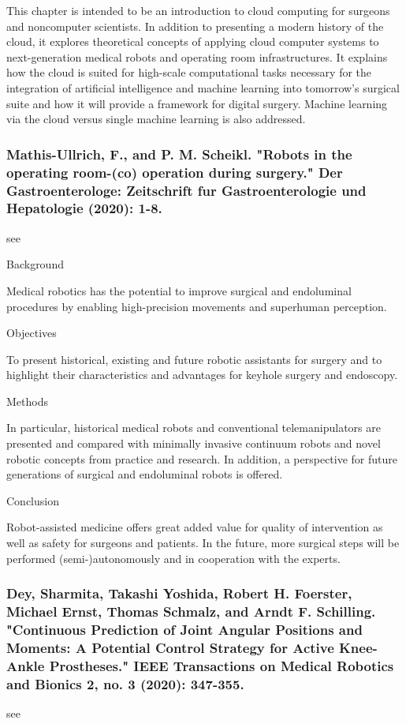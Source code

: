 \documentclass[conference]{IEEEtran}
\begin{document}
This chapter is intended to be an introduction to cloud computing for surgeons and noncomputer scientists. In addition to presenting a modern history of the cloud, it explores theoretical concepts of applying cloud computer systems to next-generation medical robots and operating room infrastructures. It explains how the cloud is suited for high-scale computational tasks necessary for the integration of artificial intelligence and machine learning into tomorrow’s surgical suite and how it will provide a framework for digital surgery. Machine learning via the cloud versus single machine learning is also addressed.

\medskip
\subsubsection{Mathis-Ullrich, F., and P. M. Scheikl. "Robots in the operating room-(co) operation during surgery." Der Gastroenterologe: Zeitschrift fur Gastroenterologie und Hepatologie (2020): 1-8.}
see \cite{mathis2020robots}

Background

Medical robotics has the potential to improve surgical and endoluminal procedures by enabling high-precision movements and superhuman perception.

Objectives

To present historical, existing and future robotic assistants for surgery and to highlight their characteristics and advantages for keyhole surgery and endoscopy.

Methods

In particular, historical medical robots and conventional telemanipulators are presented and compared with minimally invasive continuum robots and novel robotic concepts from practice and research. In addition, a perspective for future generations of surgical and endoluminal robots is offered.

Conclusion

Robot-assisted medicine offers great added value for quality of intervention as well as safety for surgeons and patients. In the future, more surgical steps will be performed (semi-)autonomously and in cooperation with the experts.

\medskip
\subsubsection{Dey, Sharmita, Takashi Yoshida, Robert H. Foerster, Michael Ernst, Thomas Schmalz, and Arndt F. Schilling. "Continuous Prediction of Joint Angular Positions and Moments: A Potential Control Strategy for Active Knee-Ankle Prostheses." IEEE Transactions on Medical Robotics and Bionics 2, no. 3 (2020): 347-355.}
see \cite{dey2020continuous}
\end{document}
